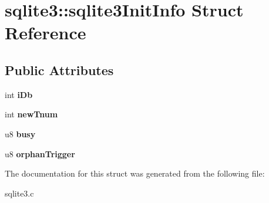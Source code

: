 \hypertarget{structsqlite3_1_1sqlite3_init_info}{\section{sqlite3\-:\-:sqlite3\-Init\-Info Struct Reference}
\label{structsqlite3_1_1sqlite3_init_info}
}
\subsection*{Public Attributes}
\begin{DoxyCompactItemize}
\item 
\hypertarget{structsqlite3_1_1sqlite3_init_info_a1dd98d805ac1ba2c0fe4d911d0639927}{int {\bfseries i\-Db}}\label{structsqlite3_1_1sqlite3_init_info_a1dd98d805ac1ba2c0fe4d911d0639927}

\item 
\hypertarget{structsqlite3_1_1sqlite3_init_info_a65250c8c5f215989e64294ede6c1c268}{int {\bfseries new\-Tnum}}\label{structsqlite3_1_1sqlite3_init_info_a65250c8c5f215989e64294ede6c1c268}

\item 
\hypertarget{structsqlite3_1_1sqlite3_init_info_a6ac01842e0ae68023cb60fea93bd8688}{u8 {\bfseries busy}}\label{structsqlite3_1_1sqlite3_init_info_a6ac01842e0ae68023cb60fea93bd8688}

\item 
\hypertarget{structsqlite3_1_1sqlite3_init_info_ac292839cc81d109206133a80949c45a6}{u8 {\bfseries orphan\-Trigger}}\label{structsqlite3_1_1sqlite3_init_info_ac292839cc81d109206133a80949c45a6}

\end{DoxyCompactItemize}


The documentation for this struct was generated from the following file\-:\begin{DoxyCompactItemize}
\item 
sqlite3.\-c\end{DoxyCompactItemize}
